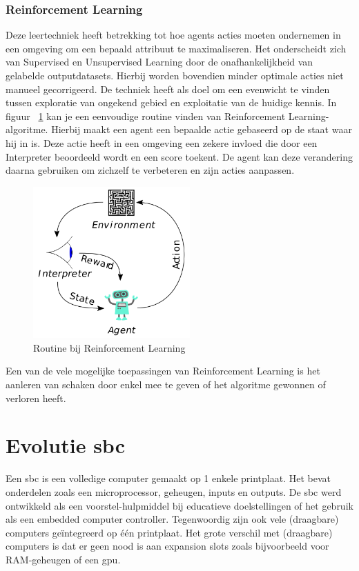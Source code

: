 	\subsubsection{Reinforcement Learning} Deze leertechniek heeft betrekking tot hoe agents acties moeten ondernemen in een omgeving om een bepaald attribuut te maximaliseren. Het onderscheidt zich van Supervised en Unsupervised Learning door de onafhankelijkheid van gelabelde outputdatasets. Hierbij worden bovendien minder optimale acties niet manueel gecorrigeerd. De techniek heeft als doel om een evenwicht te vinden tussen exploratie van ongekend gebied en exploitatie van de huidige kennis. In figuur ~\ref{fig:reinforcemntLearning} kan je een eenvoudige routine vinden van Reinforcement Learning-algoritme. Hierbij maakt een agent een bepaalde actie gebaseerd op de staat waar hij in is. Deze actie heeft in een omgeving een zekere invloed die door een Interpreter beoordeeld wordt en een score toekent. De agent kan deze verandering daarna gebruiken om zichzelf te verbeteren en zijn acties aanpassen. 
	\begin{figure}
		\centering
		\includegraphics[width=60mm]{afbeeldingen/Reinforcement_learning_diagram.PNG}
		\caption{Routine bij Reinforcement Learning}
		\label{fig:reinforcemntLearning}
	\end{figure}
	Een van de vele mogelijke toepassingen van Reinforcement Learning is het aanleren van schaken door enkel mee te geven of het algoritme gewonnen of verloren heeft. 
	

\newpage	

\section{Evolutie \gls{sbc}}
Een \gls{sbc} is een volledige computer gemaakt op 1 enkele printplaat. Het bevat onderdelen zoals een microprocessor, geheugen, inputs en outputs. De \gls{sbc} werd ontwikkeld als een voorstel-hulpmiddel bij educatieve doelstellingen of het gebruik als een embedded computer controller. Tegenwoordig zijn ook vele (draagbare) computers ge\"integreerd op \'e\'en printplaat. Het grote verschil met (draagbare) computers is dat er geen nood is aan expansion slots zoals bijvoorbeeld voor RAM-geheugen of een \gls{gpu}.
